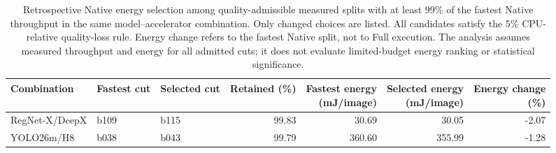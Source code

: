 \begin{table}[t]
\centering\small
\setlength{\tabcolsep}{3pt}
\caption{Retrospective Native energy selection among quality-admissible measured splits with at least 99\% of the fastest Native throughput in the same model--accelerator combination. Only changed choices are listed. All candidates satisfy the 5\% CPU-relative quality-loss rule. Energy change refers to the fastest Native split, not to Full execution. The analysis assumes measured throughput and energy for all admitted cuts; it does not evaluate limited-budget energy ranking or statistical significance.}
\label{tab:energy-floor-99}
\begin{tabular*}{\textwidth}{@{\extracolsep{\fill}}lllrrrr@{}}
\toprule
Combination & Fastest cut & Selected cut & Retained (\%) & \shortstack{Fastest energy\\(mJ/image)} & \shortstack{Selected energy\\(mJ/image)} & \shortstack{Energy change\\(\%)} \\
\midrule
RegNet-X/DeepX & b109 & b115 & 99.83 & 30.69 & 30.05 & -2.07 \\
YOLO26m/H8 & b038 & b043 & 99.79 & 360.60 & 355.99 & -1.28 \\
\bottomrule
\end{tabular*}
\end{table}
